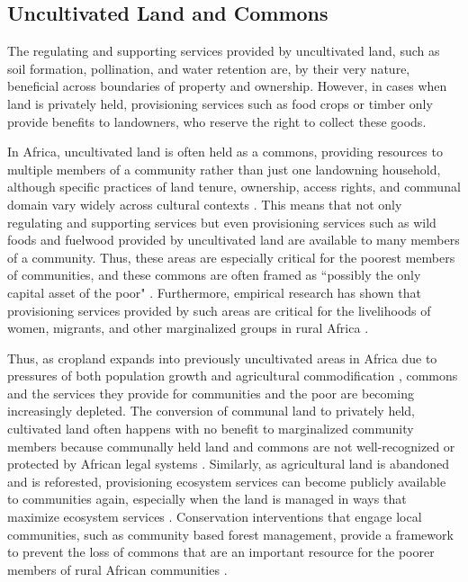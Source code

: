 \documentclass[titlepage]{article}
\begin{document}
\subsection{Uncultivated Land and Commons}
The regulating and supporting services provided by uncultivated land, such as soil formation, pollination, and water retention are, by their very nature, beneficial across boundaries of property and ownership.  However, in cases when land is privately held, provisioning services such as food crops or timber only provide benefits to landowners, who reserve the right to collect these goods.  

In Africa, uncultivated land is often held as a commons, providing resources to multiple members of a community rather than just one landowning household, although specific practices of land tenure, ownership, access rights, and communal domain vary widely across cultural contexts \citep{Wily2008}.  This means that not only regulating and supporting services but even provisioning services such as wild foods and fuelwood provided by uncultivated land are available to many members of a community.  Thus, these areas are especially critical for the poorest members of communities, and these commons are often framed as ``possibly the only capital asset of the poor" \citep{Wily2008}.  Furthermore, empirical research has shown that provisioning services provided by such areas are critical for the livelihoods of women, migrants, and other marginalized groups in rural Africa \citep{Coulibaly-Lingani2009, Pouliot2013}.

Thus, as cropland expands into previously uncultivated areas in Africa due to pressures of both population growth and agricultural commodification \citep{Rudel2013, Laurance2014}, commons and the services they provide for communities and the poor are becoming increasingly depleted.  The conversion of communal land to privately held, cultivated land often happens with no benefit to marginalized community members because communally held land and commons are not well-recognized or protected by African legal systems \citep{Wily2011}.  Similarly, as agricultural land is abandoned and is reforested, provisioning ecosystem services can become publicly available to communities again, especially when the land is managed in ways that maximize ecosystem services \citep{Laris2008, Eldridge2011, Venter2018}.  Conservation interventions that engage local communities, such as community based forest management, provide a framework to prevent the loss of commons that are an important resource for the poorer members of rural African communities \citep{bray2003mexico}.
\end{document}

